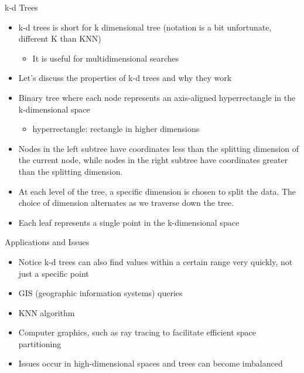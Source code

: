\documentclass[
  ignorenonframetext,
]{beamer}
\providecommand{\tightlist}{%
  \setlength{\itemsep}{0pt}\setlength{\parskip}{0pt}}\usepackage{longtable,booktabs,array}
\begin{document}
\begin{frame}{k-d Trees}
\protect\hypertarget{k-d-trees}{}
\begin{itemize}
\item
  k-d trees is short for k dimensional tree (notation is a bit
  unfortunate, different K than KNN)

  \begin{itemize}
  \tightlist
  \item
    It is useful for multidimensional searches
  \end{itemize}
\item
  Let's discuss the properties of k-d trees and why they work
\item
  Binary tree where each node represents an axis-aligned hyperrectangle
  in the k-dimensional space

  \begin{itemize}
  \tightlist
  \item
    hyperrectangle: rectangle in higher dimensions
  \end{itemize}
\item
  Nodes in the left subtree have coordinates less than the splitting
  dimension of the current node, while nodes in the right subtree have
  coordinates greater than the splitting dimension.
\item
  At each level of the tree, a specific dimension is chosen to split the
  data. The choice of dimension alternates as we traverse down the tree.
\item
  Each leaf represents a single point in the k-dimensional space
\end{itemize}
\end{frame}

\begin{frame}{Applications and Issues}
\protect\hypertarget{applications-and-issues}{}
\begin{itemize}
\item
  Notice k-d trees can also find values within a certain range very
  quickly, not just a specific point
\item
  GIS (geographic information systems) queries
\item
  KNN algorithm
\item
  Computer graphics, such as ray tracing to facilitate efficient space
  partitioning
\item
  Issues occur in high-dimensional spaces and trees can become
  imbalanced
\end{itemize}
\end{frame}
\end{document}
